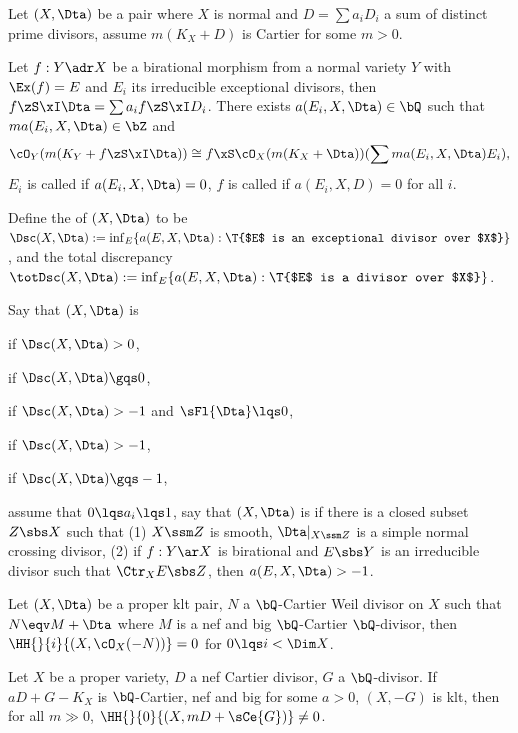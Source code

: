 \documentclass[article, a4paper, twoside]{universal}
\begin{document}
\begin{dfn}[2.25, 2.28, 2.34, 2.37, 6.22]
	Let $(X,\Dta)$ be a pair where $X$ is normal and $D=\sum a_{i}D_{i}$ a sum of distinct prime divisors, assume $m(K_{X}+D)$ is Cartier for some $m>0$.


	Let $f:Y\adr X$ be a birational morphism from a normal variety $Y$ with $\Ex(f)=E$ and $E_{i}$ its irreducible exceptional divisors, then $f\zS\xI\Dta=\sum a_{i}f\zS\xI D_{i}$. There exists $a(E_{i},X,\Dta)\in\bQ$ such that $ma(E_{i},X,\Dta)\in\bZ$ and
	\[
		\cO_{Y}(m(K_{Y}+f\zS\xI\Dta))\cong f\xS\cO_{X}(m(K_{X}+\Dta))(\sum ma(E_{i},X,\Dta)E_{i}),
	\]
	$E_{i}$ is called  if $a(E_{i},X,\Dta)=0$, $f$ is called  if $a(E_{i},X,D)=0$ for all $i$.

	Define the  of $(X,\Dta)$ to be $\Dsc(X,\Dta):=\inf_{E}\{a(E,X,\Dta):\T{$E$ is an exceptional divisor over $X$}\}$, and the total discrepancy $\totDsc(X,\Dta):=\inf_{E}\{a(E,X,\Dta):\T{$E$ is a divisor over $X$}\}$.


	Say that $(X,\Dta)$ is
	\begin{itm}
		\item {} if $\Dsc(X,\Dta)>0$,
		\item {} if $\Dsc(X,\Dta)\gqs0$,
		\item {} if $\Dsc(X,\Dta)>-1$ and $\sFl{\Dta}\lqs0$,
		\item {} if $\Dsc(X,\Dta)>-1$,
		\item {} if $\Dsc(X,\Dta)\gqs-1$,
	\end{itm}
	assume that $0\lqs a_{i}\lqs1$, say that $(X,\Dta)$ is  if there is a closed subset $Z\sbs X$ such that (1) $X\ssm Z$ is smooth, $\Dta|_{X\ssm Z}$ is a simple normal crossing divisor, (2) if $f:Y\ar X$ is birational and $E\sbs Y$ is an irreducible divisor such that $\Ctr_{X}E\sbs Z$, then $a(E,X,\Dta)>-1$.
\end{dfn}

\begin{thm}
	Let $(X,\Dta)$ be a proper klt pair, $N$ a $\bQ$-Cartier Weil divisor on $X$ such that $N\eqv M+\Dta$ where $M$ is a nef and big $\bQ$-Cartier $\bQ$-divisor, then $\HH{}{i}{(X,\cO_{X}(-N))}=0$ for $0\lqs i <\Dim X$.
\end{thm}

\begin{thm}
	Let $X$ be a proper variety, $D$ a nef Cartier divisor, $G$ a $\bQ$-divisor. If $aD+G-K_{X}$ is $\bQ$-Cartier, nef and big for some $a>0$, $(X,-G)$ is klt, then for all $m\gg0$, $\HH{}{0}{(X,mD+\sCe{G})}\neq0$.
\end{thm}
\end{document}

